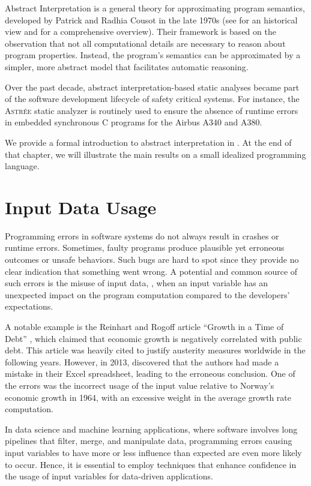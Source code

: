 Abstract Interpretation  is a general theory for approximating program semantics, developed by Patrick and Radhia Cousot in the late 1970s (see  for an historical view and  for a comprehensive overview).
Their framework is based on the observation that not all computational details are necessary to reason about program properties.
Instead, the program's semantics can be approximated by a simpler, more abstract model that facilitates automatic reasoning.

Over the past decade, abstract interpretation-based static analyses became part of the software development lifecycle of safety critical systems.
For instance, the \textsc{Astrée} static analyzer  is routinely used to ensure the absence of runtime errors in embedded synchronous C programs for the Airbus A340 and A380.

We provide a formal introduction to abstract interpretation in .
At the end of that chapter, we will illustrate the main results on a small idealized programming language.

\section{Input Data Usage}

Programming errors in software systems do not always result in crashes or runtime errors.
Sometimes, faulty programs produce plausible yet erroneous outcomes or unsafe behaviors.
Such bugs are hard to spot since they provide no clear indication that something went wrong.
A potential and common source of such errors is the misuse of input data, \ie, when an input variable has an unexpected impact on the program computation compared to the developers' expectations.

A notable example is the Reinhart and Rogoff article “Growth in a Time of Debt” , which claimed that economic growth is negatively correlated with public debt.
This article was heavily cited to justify austerity measures worldwide in the following years.
However, in 2013,  discovered that the authors had made a mistake in their Excel spreadsheet, leading to the erroneous conclusion.
One of the errors was the incorrect usage of the input value relative to Norway's economic growth in 1964, with an excessive weight in the average growth rate computation.

In data science and machine learning applications, where software involves long pipelines that filter, merge, and manipulate data, programming errors causing input variables to have more or less influence than expected are even more likely to occur.
Hence, it is essential to employ techniques that enhance confidence in the usage of input variables for data-driven applications.



